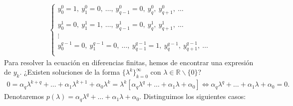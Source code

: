 \begin{align*}
    \left\{ \begin{array}{lcc}
             y_0^0 = 1,\ y_1^0 = 0,\ \ldots,\ y_{q-1}^0 = 0,\ y_q^0,\ y_{q+1}^0,\ \ldots\\
             \\ y_0^1 = 0,\ y_1^1 = 1,\ \ldots,\ y_{q-1}^1 = 0,\ y_q^1,\ y_{q+1}^1,\ \ldots\\
             \vdots \\
              y_0^{q-1} = 0,\ y_1^{q-1} = 0,\ \ldots,\ y_{q-1}^{q-1} = 1,\ y_q^{q-1},\ y_{q+1}^{q-1},\ \ldots\\
             \end{array}
   \right.
\end{align*}
Para resolver la ecuación en diferencias finitas, hemos de encontrar una expresión de $y_k$. ¿Existen soluciones de la forma $\{\lambda^k\}_{k=0}^{\infty}$ con $\lambda \in \mathbb{R} \backslash \{0\}$?
\begin{align*}
    0 = \alpha_q \lambda^{k+q} + \ldots+ \alpha_1 \lambda^{k+1} + \alpha_0 \lambda^{k} = \lambda^k[\alpha_q \lambda^{q} + \ldots + \alpha_1 \lambda + \alpha_0] \Longleftrightarrow \alpha_q \lambda^{q} + \ldots + \alpha_1 \lambda + \alpha_0 = 0.
\end{align*}
Denotaremos $p(\lambda) = \alpha_q \lambda^{q} + \ldots + \alpha_1 \lambda + \alpha_0$. Distinguimos los siguientes casos:
